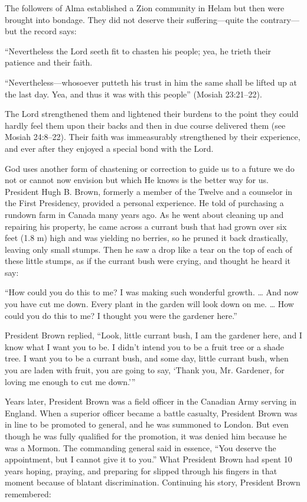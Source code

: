 \documentclass[letterpaper, 11pt]{report}
\begin{document}
The followers of Alma established a Zion community in Helam but then were brought into bondage. They did not deserve their suffering—quite the contrary—but the record says:

“Nevertheless the Lord seeth fit to chasten his people; yea, he trieth their patience and their faith.

“Nevertheless—whosoever putteth his trust in him the same shall be lifted up at the last day. Yea, and thus it was with this people” (Mosiah 23:21–22).

The Lord strengthened them and lightened their burdens to the point they could hardly feel them upon their backs and then in due course delivered them (see Mosiah 24:8–22). Their faith was immeasurably strengthened by their experience, and ever after they enjoyed a special bond with the Lord.

God uses another form of chastening or correction to guide us to a future we do not or cannot now envision but which He knows is the better way for us. President Hugh B. Brown, formerly a member of the Twelve and a counselor in the First Presidency, provided a personal experience. He told of purchasing a rundown farm in Canada many years ago. As he went about cleaning up and repairing his property, he came across a currant bush that had grown over six feet (1.8 m) high and was yielding no berries, so he pruned it back drastically, leaving only small stumps. Then he saw a drop like a tear on the top of each of these little stumps, as if the currant bush were crying, and thought he heard it say:

“How could you do this to me? I was making such wonderful growth. … And now you have cut me down. Every plant in the garden will look down on me. … How could you do this to me? I thought you were the gardener here.”

President Brown replied, “Look, little currant bush, I am the gardener here, and I know what I want you to be. I didn’t intend you to be a fruit tree or a shade tree. I want you to be a currant bush, and some day, little currant bush, when you are laden with fruit, you are going to say, ‘Thank you, Mr. Gardener, for loving me enough to cut me down.’”

Years later, President Brown was a field officer in the Canadian Army serving in England. When a superior officer became a battle casualty, President Brown was in line to be promoted to general, and he was summoned to London. But even though he was fully qualified for the promotion, it was denied him because he was a Mormon. The commanding general said in essence, “You deserve the appointment, but I cannot give it to you.” What President Brown had spent 10 years hoping, praying, and preparing for slipped through his fingers in that moment because of blatant discrimination. Continuing his story, President Brown remembered:
\end{document}
